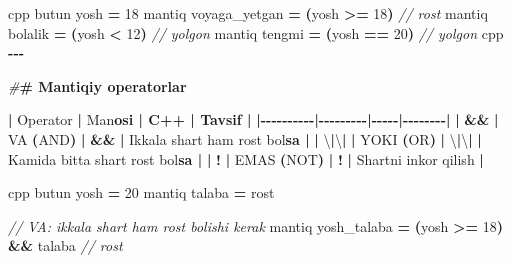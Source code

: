 \documentclass[a4paper,11pt,twoside,openright]{book}
\newenvironment{Shaded}{\begin{snugshade}}{\end{snugshade}}
\newcommand{\CharTok}[1]{\textcolor[rgb]{0.31,0.60,0.02}{#1}}
\newcommand{\CommentTok}[1]{\textcolor[rgb]{0.56,0.35,0.01}{\textit{#1}}}
\newcommand{\DecValTok}[1]{\textcolor[rgb]{0.00,0.00,0.81}{#1}}
\newcommand{\ErrorTok}[1]{\textcolor[rgb]{0.64,0.00,0.00}{\textbf{#1}}}
\newcommand{\NormalTok}[1]{#1}
\newcommand{\OperatorTok}[1]{\textcolor[rgb]{0.81,0.36,0.00}{\textbf{#1}}}
\newcommand{\PreprocessorTok}[1]{\textcolor[rgb]{0.56,0.35,0.01}{\textit{#1}}}
\begin{document}
\begin{Shaded}
\begin{Highlighting}[]
\ErrorTok{\textasciigrave{}\textasciigrave{}\textasciigrave{}}\NormalTok{cpp}
\NormalTok{butun yosh }\OperatorTok{=} \DecValTok{18}
\NormalTok{mantiq voyaga\_yetgan }\OperatorTok{=} \OperatorTok{(}\NormalTok{yosh }\OperatorTok{\textgreater{}=} \DecValTok{18}\OperatorTok{)}     \CommentTok{// rost}
\NormalTok{mantiq bolalik }\OperatorTok{=} \OperatorTok{(}\NormalTok{yosh }\OperatorTok{\textless{}} \DecValTok{12}\OperatorTok{)}            \CommentTok{// yolg\textquotesingle{}on}
\NormalTok{mantiq tengmi }\OperatorTok{=} \OperatorTok{(}\NormalTok{yosh }\OperatorTok{==} \DecValTok{20}\OperatorTok{)}            \CommentTok{// yolg\textquotesingle{}on}
\ErrorTok{\textasciigrave{}\textasciigrave{}\textasciigrave{}}\NormalTok{cpp}
\OperatorTok{{-}{-}{-}}

\PreprocessorTok{\#}\ErrorTok{\# Mantiqiy operatorlar}

\OperatorTok{|}\NormalTok{ Operator }\OperatorTok{|}\NormalTok{ Ma}\CharTok{\textquotesingle{}n}\ErrorTok{osi | C++ | Tavsif |}
\OperatorTok{|{-}{-}{-}{-}{-}{-}{-}{-}{-}{-}|{-}{-}{-}{-}{-}{-}{-}{-}{-}|{-}{-}{-}{-}{-}|{-}{-}{-}{-}{-}{-}{-}{-}|}
\OperatorTok{|} \ErrorTok{\textasciigrave{}}\OperatorTok{\&\&}\ErrorTok{\textasciigrave{}} \OperatorTok{|}\NormalTok{ VA }\OperatorTok{(}\NormalTok{AND}\OperatorTok{)} \OperatorTok{|} \ErrorTok{\textasciigrave{}}\OperatorTok{\&\&}\ErrorTok{\textasciigrave{}} \OperatorTok{|}\NormalTok{ Ikkala shart ham rost bo}\CharTok{\textquotesingle{}l}\ErrorTok{sa |}
\OperatorTok{|} \ErrorTok{\textasciigrave{}}\NormalTok{\textbackslash{}}\OperatorTok{|}\NormalTok{\textbackslash{}}\OperatorTok{|}\ErrorTok{\textasciigrave{}} \OperatorTok{|}\NormalTok{ YOKI }\OperatorTok{(}\NormalTok{OR}\OperatorTok{)} \OperatorTok{|} \ErrorTok{\textasciigrave{}}\NormalTok{\textbackslash{}}\OperatorTok{|}\NormalTok{\textbackslash{}}\OperatorTok{|}\ErrorTok{\textasciigrave{}} \OperatorTok{|}\NormalTok{ Kamida bitta shart rost bo}\CharTok{\textquotesingle{}l}\ErrorTok{sa |}
\OperatorTok{|} \ErrorTok{\textasciigrave{}}\OperatorTok{!}\ErrorTok{\textasciigrave{}} \OperatorTok{|}\NormalTok{ EMAS }\OperatorTok{(}\NormalTok{NOT}\OperatorTok{)} \OperatorTok{|} \ErrorTok{\textasciigrave{}}\OperatorTok{!}\ErrorTok{\textasciigrave{}} \OperatorTok{|}\NormalTok{ Shartni inkor qilish }\OperatorTok{|}

\ErrorTok{\textasciigrave{}\textasciigrave{}\textasciigrave{}}\NormalTok{cpp}
\NormalTok{butun yosh }\OperatorTok{=} \DecValTok{20}
\NormalTok{mantiq talaba }\OperatorTok{=}\NormalTok{ rost}

\CommentTok{// VA: ikkala shart ham rost bo\textquotesingle{}lishi kerak}
\NormalTok{mantiq yosh\_talaba }\OperatorTok{=} \OperatorTok{(}\NormalTok{yosh }\OperatorTok{\textgreater{}=} \DecValTok{18}\OperatorTok{)} \OperatorTok{\&\&}\NormalTok{ talaba     }\CommentTok{// rost}


\end{Highlighting}
\end{Shaded}
\end{document}
